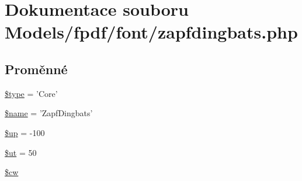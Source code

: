 \hypertarget{zapfdingbats_8php}{\section{Dokumentace souboru Models/fpdf/font/zapfdingbats.php}
\label{zapfdingbats_8php}
}
\subsection*{Proměnné}
\begin{DoxyCompactItemize}
\item 
\hyperlink{zapfdingbats_8php_a9a4a6fba2208984cabb3afacadf33919}{\$type} = 'Core'
\item 
\hyperlink{zapfdingbats_8php_ab2fc40d43824ea3e1ce5d86dee0d763b}{\$name} = 'Zapf\-Dingbats'
\item 
\hyperlink{zapfdingbats_8php_a6b5ad2ac55f9df46e8f34e78fbd6f176}{\$up} = -\/100
\item 
\hyperlink{zapfdingbats_8php_aadd3f841051043ee58e587e840e8dd0b}{\$ut} = 50
\item 
\hyperlink{zapfdingbats_8php_ac2951b03dbb0317e6c61ec920b7479dc}{\$cw}
\end{DoxyCompactItemize}


